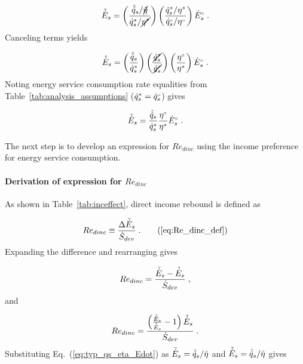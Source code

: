 \begin{equation}
  \hat{\dot{E}}_s = \left( \frac{\hat{\dot{q}}_s / \cancel{\hat{\eta}}}{{\dot{q}}^*_s / \cancel{{\eta}^*}} \right)
                \left( \frac{{\dot{q}}^*_s / {\eta}^*}{{}{\dot{q}}^{\scriptscriptstyle \circ}_s / {}{\eta}^{\scriptscriptstyle \circ}} \right)
                {}{\dot{E}}^{\scriptscriptstyle \circ}_s \; .
\end{equation}
%
Canceling terms yields

\begin{equation}
  \hat{\dot{E}}_s = \left( \frac{\hat{\dot{q}}_s}{{\dot{q}}^*_s} \right)
                \left( \frac{\cancel{{\dot{q}}^*_s}}{\cancel{{}{\dot{q}}^{\scriptscriptstyle \circ}_s}} \right)
                \left( \frac{{}{\eta}^{\scriptscriptstyle \circ}}{{\eta}^*}  \right)
                {}{\dot{E}}^{\scriptscriptstyle \circ}_s \; .
\end{equation}
%
Noting energy service consumption rate equalities from Table~\ref{tab:analysis_assumptions}
(${\dot{q}}^*_s = {}{\dot{q}}^{\scriptscriptstyle \circ}_s$) gives

\begin{equation} \label{eq:E_dot_s_hat}
  \hat{\dot{E}}_s = \frac{\hat{\dot{q}}_s}{{\dot{q}}^*_s}
                \frac{{}{\eta}^{\scriptscriptstyle \circ}}{{\eta}^*}
                {}{\dot{E}}^{\scriptscriptstyle \circ}_s \; .
\end{equation}

The next step is to develop an expression for $Re_{dinc}$
using the income preference for energy service consumption.


\paragraph{Derivation of expression for $Re_{dinc}$}
\label{sec:Re_dinc}

As shown in Table~\ref{tab:inceffect}, direct income rebound is defined as

\begin{equation}
  Re_{dinc} \equiv \frac{\Delta \rainc{E}_s}{\Sdot} \; . \tag{\ref{eq:Re_dinc_def}}
\end{equation}
%
Expanding the difference and rearranging gives

\begin{equation}
  Re_{dinc} = \frac{\bar{\dot{E}}_s - \hat{\dot{E}}_s}{\dot{S}_{dev}} \; ,
\end{equation}
%
and

\begin{equation}
  Re_{dinc} = \frac{\left( \frac{\bar{\dot{E}}_s}{\hat{\dot{E}}_s} - 1  \right) \hat{\dot{E}}_s}{\dot{S}_{dev}} \; .
\end{equation}
%
Substituting Eq.~(\ref{eq:typ_qs_eta_Edot}) as
$\bar{\dot{E}}_s = \bar{\dot{q}}_s / \bar{\eta}$ and
$\hat{\dot{E}}_s = \hat{\dot{q}}_s / \hat{\eta}$ gives

